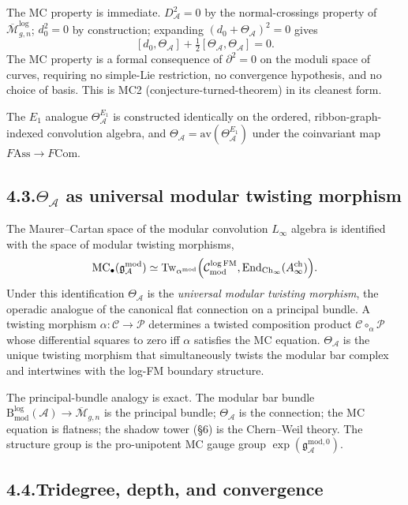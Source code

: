 \documentclass[11pt,reqno]{amsart}
\theoremstyle{definition}
\theoremstyle{remark}
\providecommand{\cA}{\mathcal{A}}
\providecommand{\cC}{\mathcal{C}}
\providecommand{\cM}{\mathcal{M}}
\providecommand{\cP}{\mathcal{P}}
\providecommand{\gAmod}{\mathfrak{g}^{\mathrm{mod}}_\cA}
\providecommand{\Ass}{\mathrm{Ass}}
\providecommand{\Com}{\mathrm{Com}}
\numberwithin{equation}{section}
\begin{document}
The MC property is immediate. $D_\cA^2=0$ by the normal-crossings
property of $\overline{\cM}_{g,n}^{\log}$; $d_0^2=0$ by construction;
expanding $(d_0+\Theta_\cA)^2=0$ gives
\[
[d_0,\Theta_\cA]+\tfrac12[\Theta_\cA,\Theta_\cA]=0.
\]
The MC property is a formal consequence of $\partial^2=0$ on the
moduli space of curves, requiring no simple-Lie restriction, no
convergence hypothesis, and no choice of basis. This is MC2
(conjecture-turned-theorem) in its cleanest form.

The $E_1$ analogue $\Theta^{E_1}_\cA$ is constructed identically on
the ordered, ribbon-graph-indexed convolution algebra, and
$\Theta_\cA=\mathrm{av}(\Theta^{E_1}_\cA)$ under the coinvariant map
$F\!\Ass\to F\Com$.

\subsection*{4.3.\enspace $\Theta_\cA$ as universal modular twisting morphism}

The Maurer--Cartan space of the modular convolution $L_\infty$
algebra is identified with the space of modular twisting morphisms,
\[
\operatorname{MC}_\bullet(\gAmod)\simeq\operatorname{Tw}_{\alpha^{\mathrm{mod}}}\Bigl(\cC^{\log\mathrm{FM}}_{\mathrm{mod}},\operatorname{End}_{\mathrm{Ch}_\infty}(A^{\mathrm{ch}}_\infty)\Bigr).
\]
Under this identification $\Theta_\cA$ is the \emph{universal modular
twisting morphism}, the operadic analogue of the canonical flat
connection on a principal bundle. A twisting morphism
$\alpha\colon\cC\to\cP$ determines a twisted composition product
$\cC\circ_\alpha\cP$ whose differential squares to zero iff $\alpha$
satisfies the MC equation. $\Theta_\cA$ is the unique twisting
morphism that simultaneously twists the modular bar complex and
intertwines with the log-FM boundary structure.

The principal-bundle analogy is exact. The modular bar bundle
$\mathrm B^{\log}_{\mathrm{mod}}(\cA)\to\overline{\cM}_{g,n}$ is the
principal bundle; $\Theta_\cA$ is the connection; the MC equation is
flatness; the shadow tower (\S6) is the Chern--Weil theory. The
structure group is the pro-unipotent MC gauge group
$\exp(\mathfrak g^{\mathrm{mod},0}_\cA)$.

\subsection*{4.4.\enspace Tridegree, depth, and convergence}
\end{document}
